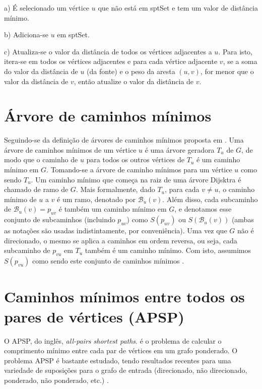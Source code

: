     \quad a) É selecionado um vértice $u$ que não está em sptSet e tem um valor de distância mínimo.

    \quad b) Adiciona-se $u$ em sptSet.

    \quad c) Atualiza-se o valor da distância de todos os vértices adjacentes a $u$. Para isto, itera-se em todos os vértices adjacentes e para cada vértice adjacente $v$, se a soma do valor da distância de $u$ (da fonte) e o peso da aresta $(u, v)$, for menor que o valor da distância de $v$, então atualize o valor da distância de $v$.

\section{Árvore de caminhos mínimos}
Seguindo-se da definição de árvores de caminhos mínimos proposta em \cite{alane2021}. Uma árvore de caminhos mínimos de um vértice $u$ é uma árvore geradora $T_u$ de $G$, de modo que o caminho de $u$ para todos os outros vértices de $T_u$ é um caminho mínimo em $G$. Tomando-se a árvore de caminho mínimos para um vértice $u$ como sendo $T_u$. Um caminho mínimo que começa na raiz de uma árvore Dijsktra é chamado de ramo de $G$. Mais formalmente, dado $T_u$, para cada $v \neq u$, o caminho mínimo de $u$ a $v$ é um ramo, denotado por $\mathcal{B}_u(v)$. Além disso, cada subcaminho de $\mathcal{B}_u(v) = p_{uv}$ é também um caminho mínimo em $G$, e denotamos esse conjunto de subcaminhos (incluindo $p_{uv}$) como $S(p_{uv})$ ou $S(\mathcal{B}_u(v))$ (ambas as notações são usadas indistintamente, por conveniência). Uma vez que $G$ não é direcionado, o mesmo se aplica a caminhos em ordem reversa, ou seja, cada subcaminho de $p_{vu}$ em $T_u$ também é um caminho mínimo. Com isto, assumimos $S(p_{vu})$ como sendo este conjunto de caminhos mínimos \cite{alane2021}.

\section{Caminhos mínimos entre todos os pares de vértices (APSP)}
O APSP, do inglês, {\it all-pairs shortest paths}. é o problema de calcular o comprimento mínimo entre cada par de vértices em um grafo ponderado. O problema APSP é bastante estudado, tendo resultados recentes para uma variedade de suposições para o grafo de entrada (direcionado, não direcionado, ponderado, não ponderado, etc.) \cite{alane2021} \cite{williams2014} \cite{pettie2002}.

